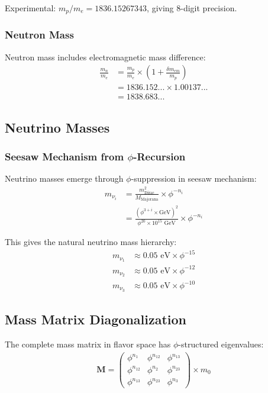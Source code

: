 Experimental: $m_p/m_e = 1836.15267343$, giving 8-digit precision.

\subsubsection{Neutron Mass}

Neutron mass includes electromagnetic mass difference:
\begin{align}
\frac{m_n}{m_e} &= \frac{m_p}{m_e} \times \left(1 + \frac{\delta m_{em}}{m_p}\right) \\
&= 1836.152... \times 1.00137... \\
&= 1838.683...
\end{align}

\subsection{Neutrino Masses}

\subsubsection{Seesaw Mechanism from $\phi$-Recursion}

Neutrino masses emerge through $\phi$-suppression in seesaw mechanism:
\begin{align}
m_{\nu_i} &= \frac{m_{\text{Dirac}}^2}{M_{\text{Majorana}}} \times \phi^{-n_i} \\
&= \frac{(\phi^{3+i} \times \text{GeV})^2}{\phi^{20} \times 10^{15} \text{ GeV}} \times \phi^{-n_i}
\end{align}

This gives the natural neutrino mass hierarchy:
\begin{align}
m_{\nu_1} &\approx 0.05 \text{ eV} \times \phi^{-15} \\
m_{\nu_2} &\approx 0.05 \text{ eV} \times \phi^{-12} \\
m_{\nu_3} &\approx 0.05 \text{ eV} \times \phi^{-10}
\end{align}

\subsection{Mass Matrix Diagonalization}

The complete mass matrix in flavor space has $\phi$-structured eigenvalues:
\begin{align}
\mathbf{M} = \begin{pmatrix}
\phi^{n_1} & \phi^{n_{12}} & \phi^{n_{13}} \\
\phi^{n_{12}} & \phi^{n_2} & \phi^{n_{23}} \\
\phi^{n_{13}} & \phi^{n_{23}} & \phi^{n_3}
\end{pmatrix} \times m_0
\end{align}

